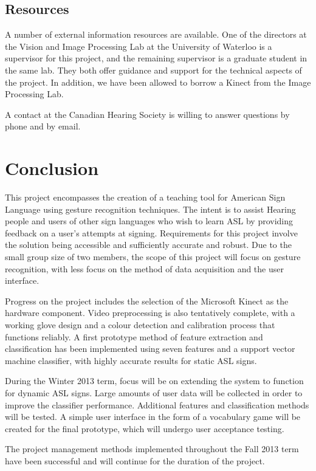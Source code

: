 \documentclass[12pt]{article}
\begin{document}
\subsection{Resources}
A number of external information resources are available. One of the directors at the Vision and Image Processing Lab at the University of Waterloo is a supervisor for this project, and the remaining supervisor is a graduate student in the same lab. They both offer guidance and support for the technical aspects of the project. In addition, we have been allowed to borrow a Kinect from the Image Processing Lab.

A contact at the Canadian Hearing Society is willing to answer questions by phone and by email.

\newpage
\section{Conclusion}
This project encompasses the creation of a teaching tool for American Sign Language using gesture recognition techniques. The intent is to assist Hearing people and users of other sign languages who wish to learn ASL by providing feedback on a user’s attempts at signing. Requirements for this project involve the solution being accessible and sufficiently accurate and robust. Due to the small group size of two members, the scope of this project will focus on gesture recognition, with less focus on the method of data acquisition and the user interface.

Progress on the project includes the selection of the Microsoft Kinect as the hardware component. Video preprocessing is also tentatively complete, with a working glove design and a colour detection and calibration process that functions reliably. A first prototype method of feature extraction and classification has been implemented using seven features and a support vector machine classifier, with highly accurate results for static ASL signs.  

During the Winter 2013 term, focus will be on extending the system to function for dynamic ASL signs. Large amounts of user data will be collected in order to improve the classifier performance. Additional features and classification methods will be tested. A simple user interface in the form of a vocabulary game will be created for the final prototype, which will undergo user acceptance testing.

The project management methods implemented throughout the Fall 2013 term have been successful and will continue for the duration of the project. 
\newpage
\onehalfspacing
{}
\end{document}
